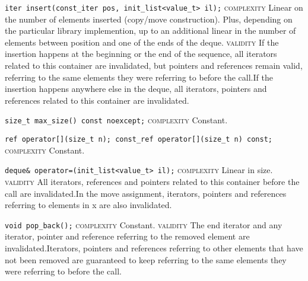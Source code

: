 \noindent{}\hspace*{0.25em}\lstinline[basicstyle=\ttfamily\color{corange}]{iter insert(const_iter pos, init_list<value_t> il);} \textsc{complexity} Linear on the number of elements inserted (copy/move construction). Plus, depending on the particular library implemention, up to an additional linear in the number of elements between position and one of the ends of the deque. \textsc{validity} If the insertion happens at the beginning or the end of the sequence, all iterators related to this container are invalidated, but pointers and references remain valid, referring to the same elements they were referring to before the call.If the insertion happens anywhere else in the deque, all iterators, pointers and references related to this container are invalidated.\\\vspace{-0.6em}

\noindent{}\hspace*{0.25em}\lstinline[basicstyle=\ttfamily\color{cgreen}]{size_t max_size() const noexcept;} \textsc{complexity} Constant.\\\vspace{-0.6em}

\noindent{}\hspace*{0.25em}\lstinline[basicstyle=\ttfamily\color{cgreen}]{ref operator[](size_t n); const_ref operator[](size_t n) const;} \textsc{complexity} Constant.\\\vspace{-0.6em}

\noindent{}\hspace*{0.25em}\lstinline[basicstyle=\ttfamily\color{corange}]{deque& operator=(init_list<value_t> il);} \textsc{complexity} Linear in size. \textsc{validity} All iterators, references and pointers related to this container before the call are invalidated.In the move assignment, iterators, pointers and references referring to elements in x are also invalidated.\\\vspace{-0.6em}

\noindent{}\hspace*{0.25em}\lstinline[basicstyle=\ttfamily\color{cgreen}]{void pop_back();} \textsc{complexity} Constant. \textsc{validity} The end iterator and any iterator, pointer and reference referring to the removed element are invalidated.Iterators, pointers and references referring to other elements that have not been removed are guaranteed to keep referring to the same elements they were referring to before the call.\\\vspace{-0.6em}


